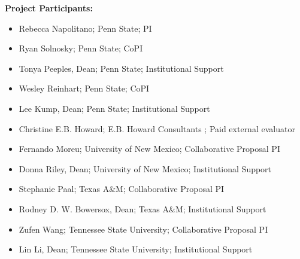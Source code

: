 \documentclass[11pt]{article}
\begin{document}
%
\pagestyle{empty} 

\noindent \textbf{Project Participants:}

\begin{itemize}
\item Rebecca Napolitano; Penn State; PI 
\item Ryan Solnosky; Penn State; CoPI 
\item Tonya Peeples, Dean; Penn State; Institutional Support
\item Wesley Reinhart; Penn State; CoPI 
\item Lee Kump, Dean; Penn State; Institutional Support





\item Christine E.B. Howard; E.B. Howard Consultants ; Paid external evaluator 

\item Fernando Moreu; University of New Mexico; Collaborative Proposal PI 
\item Donna Riley, Dean; University of New Mexico; Institutional Support 



\item Stephanie Paal; Texas A\&M; Collaborative Proposal PI 
\item Rodney D. W. Bowersox, Dean; Texas A\&M; Institutional Support



\item Zufen Wang; Tennessee State University; Collaborative Proposal PI 
\item Lin Li, Dean; Tennessee State University; Institutional Support 


\end{itemize}
\end{document}

